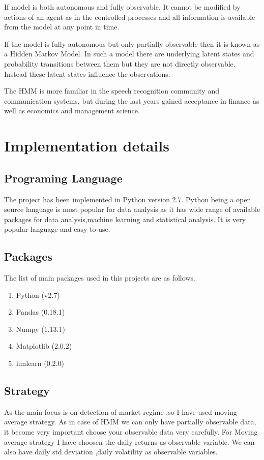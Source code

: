 \documentclass{report}
\begin{document}
If model is both autonomous and fully observable. It cannot be modified by actions of an agent as in the controlled processes and all information is available from the model at any point in time.

If the model is fully autonomous but only partially observable then it is known as a Hidden Markov Model. In such a model there are underlying latent states and probability transitions between them but they are not directly observable. Instead these latent states influence the observations.

The HMM is more familiar in the speech recognition community and communication systems, but during the last years gained acceptance in finance as well as economics and management science.


\chapter{Implementation details}
\section{Programing Language}
The project has been implemented in Python version 2.7. Python being a open source language is most popular for data analysis as it has wide range of available packages for data analysis,machine learning and statistical analysis. It is very popular language and easy to use. 
\section{Packages}
The list of main packages used in this projects are as follows.

\begin{enumerate}
  \item Python (v2.7)
  \item Pandas (0.18.1)
  \item Numpy (1.13.1)
  \item Matplotlib (2.0.2)
  \item hmlearn (0.2.0)
\end{enumerate}

\section{Strategy}
As the main focus is on detection of market regime ,so I have used moving average strategy. As in case of HMM we can only have partially observable data, it become very important choose your observable data very carefully. For Moving average strategy I have choosen the daily returns as observable variable. We can also have daily std deviation ,daily volatility as observable variables.
\end{document}
